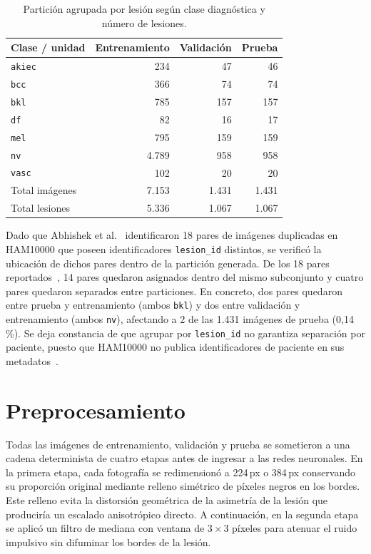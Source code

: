 \begin{table}[H]
  \centering
  \caption{Partición agrupada por lesión según clase diagnóstica y número de lesiones.}
  \label{tab:particion}
  \begin{tabularx}{\textwidth}{Yrrr}
    \toprule
    Clase / unidad & Entrenamiento & Validación & Prueba \\
    \midrule
    \texttt{akiec} & 234 & 47 & 46 \\
    \texttt{bcc} & 366 & 74 & 74 \\
    \texttt{bkl} & 785 & 157 & 157 \\
    \texttt{df} & 82 & 16 & 17 \\
    \texttt{mel} & 795 & 159 & 159 \\
    \texttt{nv} & 4.789 & 958 & 958 \\
    \texttt{vasc} & 102 & 20 & 20 \\
    Total imágenes & 7.153 & 1.431 & 1.431 \\
    Total lesiones & 5.336 & 1.067 & 1.067 \\
    \bottomrule
  \end{tabularx}
\end{table}

Dado que Abhishek et al.~\cite{abhishek2025quality} identificaron 18 pares de imágenes duplicadas en HAM10000 que poseen identificadores \texttt{lesion\_id} distintos, se verificó la ubicación de dichos pares dentro de la partición generada. De los 18 pares reportados~\cite{abhishek2025quality}, 14 pares quedaron asignados dentro del mismo subconjunto y cuatro pares quedaron separados entre particiones. En concreto, dos pares quedaron entre prueba y entrenamiento (ambos \texttt{bkl}) y dos entre validación y entrenamiento (ambos \texttt{nv}), afectando a 2 de las 1.431 imágenes de prueba (0,14\,\%). Se deja constancia de que agrupar por \texttt{lesion\_id} no garantiza separación por paciente, puesto que HAM10000 no publica identificadores de paciente en sus metadatos~\cite{tschandl2018ham10000,abhishek2025quality}.

\section{Preprocesamiento}

Todas las imágenes de entrenamiento, validación y prueba se sometieron a una cadena determinista de cuatro etapas antes de ingresar a las redes neuronales. En la primera etapa, cada fotografía se redimensionó a 224\,px o 384\,px conservando su proporción original mediante relleno simétrico de píxeles negros en los bordes. Este relleno evita la distorsión geométrica de la asimetría de la lesión que produciría un escalado anisotrópico directo. A continuación, en la segunda etapa se aplicó un filtro de mediana con ventana de $3 \times 3$ píxeles para atenuar el ruido impulsivo sin difuminar los bordes de la lesión.

